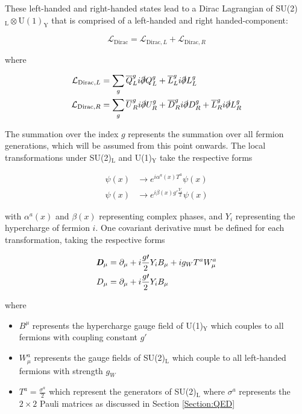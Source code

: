 \documentclass[12pt,a4paper,epsf,portrait,times,epsfig]{report}
\begin{document}
	These left-handed and right-handed states lead to a Dirac Lagrangian of SU(2)$_{\mathrm{L}} \otimes \mathrm{U(1)}_{\mathrm{Y}}$ that is comprised of a left-handed and right handed-component:
	
	\begin{equation}
		\mathcal{L}_{\mathrm{Dirac}} = \mathcal{L}_{\mathrm{Dirac},L} + \mathcal{L}_{\mathrm{Dirac},R}
	\end{equation}

	where

	\begin{align}
		\mathcal{L}_{\mathrm{Dirac},L}&=\sum_{g}\overline{Q}_{L}^{g}i\slashed{\partial}Q_{L}^{g}+\overline{L}_{L}^{g}i\slashed{\partial}L_{L}^{g} \\
		\mathcal{L}_{\mathrm{Dirac},R}&=\sum_{g}\overline{U}_{R}^{g}i\slashed{\partial}U_{R}^{g}+\overline{D}_{R}^{g}i\slashed{\partial}D_{R}^{g}+\overline{L}_{R}^{g}i\slashed{\partial}L_{R}^{g} 
	\end{align}

	The summation over the index $g$ represents the summation over all fermion generations, which will be assumed from this point onwards. The local transformations under SU(2)$_{\mathrm{L}}$ and U(1)$_{\mathrm{Y}}$ take the respective forms

	\begin{align}
		\psi(x) &\rightarrow e^{i\alpha^{a}(x)T^{a}}\psi(x) \\
		\psi(x) &\rightarrow e^{i\beta(x)g\prime\frac{Y_{i}}{2}}\psi(x)
	\end{align}

	with $\alpha^{a}(x)$ and $\beta(x)$ representing complex phases, and $Y_{i}$ representing the hypercharge of fermion $i$. One covariant derivative must be defined for each transformation, taking the respective forms

	\begin{align}
		\textit{\textbf{D}}_{\mu} &= \partial_{\mu} + i\frac{g\prime}{2}Y_{i}B_{\mu}+ig_{W}T^{a}W_{\mu}^{a} \\
		D_{\mu} &= \partial_{\mu} + i\frac{g\prime}{2}Y_{i}B_{\mu} 	
	\end{align}

	where

	\begin{itemize}
		\item $B^{\mu}$ represents the hypercharge gauge field of U(1)$_{\mathrm{Y}}$ which couples to all fermions with coupling constant $g\prime$
		\item $W_{\mu}^{a}$ represents the gauge fields of SU(2)$_{\mathrm{L}}$ which couple to all left-handed fermions with strength $g_{W}$
		\item $T^{a}=\frac{\sigma^{a}}{2}$ which represent the generators of SU(2)$_{\mathrm{L}}$ where $\sigma^{a}$ represents the $2 \times 2$ Pauli matrices as discussed in Section \ref{Section:QED}
	\end{itemize}
\end{document}
